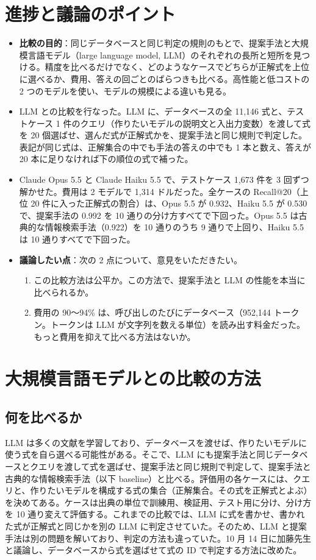 \documentclass[a4j,dvipdfmx,10pt]{jresume}
\begin{document}
\section{進捗と議論のポイント}
\begin{itemize}[leftmargin=1.5em]
  \item \textbf{比較の目的}：同じデータベースと同じ判定の規則のもとで、提案手法と大規模言語モデル（large language model, LLM）のそれぞれの長所と短所を見つける。精度を比べるだけでなく、どのようなケースでどちらが正解式を上位に選べるか、費用、答えの回ごとのばらつきも比べる。高性能と低コストの 2 つのモデルを使い、モデルの規模による違いも見る。
  \item LLM との比較を行なった。LLM に、データベースの全 11{,}146 式と、テストケース 1 件のクエリ（作りたいモデルの説明文と入出力変数）を渡して式を 20 個選ばせ、選んだ式が正解式かを、提案手法と同じ規則で判定した。表記が同じ式は、正解集合の中でも手法の答えの中でも 1 本と数え、答えが 20 本に足りなければ下の順位の式で補った。
  \item Claude Opus 5.5 と Claude Haiku 5.5 で、テストケース 1{,}673 件を 3 回ずつ解かせた。費用は 2 モデルで 1{,}314 ドルだった。全ケースの Recall@20（上位 20 件に入った正解式の割合）は、Opus 5.5 が 0.932、Haiku 5.5 が 0.530 で、提案手法の 0.992 を 10 通りの分け方すべてで下回った。Opus 5.5 は古典的な情報検索手法（0.922）を 10 通りのうち 9 通りで上回り、Haiku 5.5 は 10 通りすべてで下回った。
  \item \textbf{議論したい点}：次の 2 点について、意見をいただきたい。
  \begin{enumerate}[label=(\arabic*), leftmargin=2em]
    \item この比較方法は公平か。この方法で、提案手法と LLM の性能を本当に比べられるか。
    \item 費用の 90〜94\% は、呼び出しのたびにデータベース（952{,}144 トークン。トークンは LLM が文字列を数える単位）を読み出す料金だった。もっと費用を抑えて比べる方法はないか。
  \end{enumerate}
\end{itemize}


\section{大規模言語モデルとの比較の方法}\label{sec:method}
\subsection{何を比べるか}
LLM は多くの文献を学習しており、データベースを渡せば、作りたいモデルに使う式を自ら選べる可能性がある。そこで、LLM にも提案手法と同じデータベースとクエリを渡して式を選ばせ、提案手法と同じ規則で判定して、提案手法と古典的な情報検索手法（以下 baseline）と比べる。評価用の各ケースには、クエリと、作りたいモデルを構成する式の集合（正解集合。その式を正解式とよぶ）を決めてある。ケースは出典の単位で訓練用、検証用、テスト用に分け、分け方を 10 通り変えて評価する。これまでの比較では、LLM に式を書かせ、書かれた式が正解式と同じかを別の LLM に判定させていた。そのため、LLM と提案手法は別の問題を解いており、判定の方法も違っていた。10 月 14 日に加藤先生と議論し、データベースから式を選ばせて式の ID で判定する方法に改めた。
\end{document}
